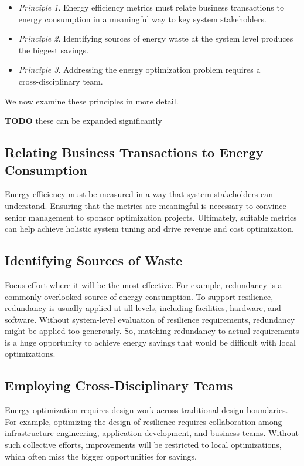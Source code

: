 \begin{itemize}
\item \emph{Principle 1}. Energy efficiency metrics must relate business transactions to energy consumption in a meaningful way to key system stakeholders.
\item \emph{Principle 2}. Identifying sources of energy waste at the system level produces the biggest savings.
\item \emph{Principle 3}. Addressing the energy optimization problem requires a \\ cross-disciplinary team.
\end{itemize}

We now examine these principles in more detail.

\textbf{TODO} these can be expanded significantly

\subsection{Relating Business Transactions to Energy Consumption}

Energy efficiency must be measured in a way that system stakeholders can understand. Ensuring that the metrics are meaningful is necessary to convince senior management to sponsor optimization projects. Ultimately, suitable metrics can help achieve holistic system tuning and drive revenue and cost optimization.

\subsection{Identifying Sources of Waste}

Focus effort where it will be the most effective. For example, redundancy is a commonly overlooked source of energy consumption. To support resilience, redundancy is usually applied at all levels, including facilities, hardware, and software. Without system-level evaluation of resilience requirements, redundancy might be applied too generously. So, matching redundancy to actual requirements is a huge opportunity to achieve energy savings that would be difficult with local optimizations.

\subsection{Employing Cross-Disciplinary Teams}

Energy optimization requires design work across traditional design boundaries. For example, optimizing the design of resilience requires collaboration among infrastructure engineering, application development, and business teams. Without such collective efforts, improvements will be restricted to local optimizations, which often miss the bigger opportunities for savings.


